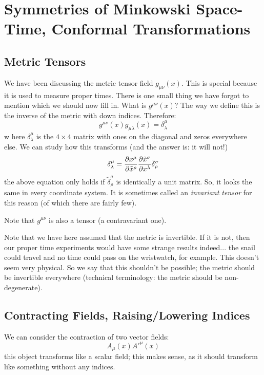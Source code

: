 \section{Symmetries of Minkowski Space-Time, Conformal Transformations}
\subsection{Metric Tensors}
We have been discussing the metric tensor field $g_{\mu\nu}(x)$. This is special because it is used to measure proper times. There is one small thing we have forgot to mention which we should now fill in. What is $g^{\mu\nu}(x)$? The way we define this is the inverse of the metric with down indices. Therefore:
\begin{equation}
    g^{\mu\nu}(x)g_{\mu\lambda}(x) = \delta^\mu_\lambda
\end{equation}w
here $\delta^\mu_\lambda$ is the $4 \times 4$ matrix with ones on the diagonal and zeros everywhere else. We can study how this transforms (and the answer is: it will not!)
\begin{equation}
    \delta^\mu_\lambda = \frac{\partial x^\mu}{\partial \tilde{x}^\rho}\frac{\partial \tilde{x}^\sigma}{\partial x^\lambda}\tilde{\delta}^\sigma_\rho
\end{equation}
the above equation only holds if $\tilde{\delta}^\sigma_\rho$ is identically a unit matrix. So, it looks the same in every coordinate system. It is sometimes called an \emph{invariant tensor} for this reason (of which there are fairly few). 

Note that $g^{\mu\nu}$ is also a tensor (a contravariant one).

Note that we have here assumed that the metric is invertible. If it is not, then our proper time experiments would have some strange results indeed... the snail could travel and no time could pass on the wristwatch, for example. This doesn't seem very physical. So we say that this shouldn't be possible; the metric should be invertible everywhere (technical terminology: the metric should be non-degenerate).

\subsection{Contracting Fields, Raising/Lowering Indices}
We can consider the contraction of two vector fields:
\begin{equation}
    A_\mu(x)A'^{\mu}(x)
\end{equation}
this object transforms like a scalar field; this makes sense, as it should transform like something without any indices.

